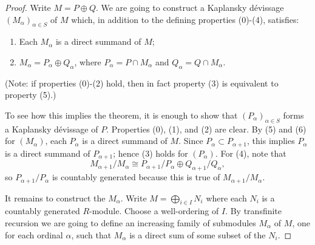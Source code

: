 \documentclass{amsart}
\theoremstyle{plain}
\theoremstyle{definition}
\theoremstyle{remark}
\numberwithin{equation}{subsection}
\begin{document}
\begin{proof}
Write $M = P \oplus Q$.  We are going to construct a Kaplansky d\'evissage
$(M_{\alpha})_{\alpha \in S}$ of $M$ which, in addition to the defining
properties (0)-(4), satisfies:
\begin{enumerate}
\item[(5)] Each $M_{\alpha}$ is a direct summand of $M$;
\item[(6)] $M_{\alpha} = P_{\alpha} \oplus Q_{\alpha}$, where $P_{\alpha} =P
\cap M_{\alpha}$ and $Q_\alpha = Q \cap M_{\alpha}$.
\end{enumerate}
(Note: if properties (0)-(2) hold, then in fact property (3) is equivalent to
property (5).)

\medskip\noindent
To see how this implies the theorem, it is enough to show that
$(P_{\alpha})_{\alpha \in S}$ forms a Kaplansky d\'evissage of $P$.  Properties
(0), (1), and (2) are clear.  By (5) and (6) for $(M_{\alpha})$, each
$P_{\alpha}$ is a direct summand of $M$.  Since $P_{\alpha} \subset P_{\alpha +
1}$, this implies $P_{\alpha}$ is a direct summand of $P_{\alpha + 1}$; hence
(3) holds for $(P_{\alpha})$.  For (4), note that
$$
M_{\alpha + 1}/M_{\alpha} \cong P_{\alpha + 1}/P_{\alpha} \oplus
Q_{\alpha + 1}/Q_{\alpha},
$$
so $P_{\alpha + 1}/P_{\alpha}$ is countably generated because this is true of
$M_{\alpha + 1}/M_{\alpha}$.

\medskip\noindent
It remains to construct the $M_{\alpha}$.  Write $M = \bigoplus_{i \in I} N_i$
where each $N_i$ is a countably generated $R$-module.  Choose a well-ordering
of $I$.  By transfinite recursion we are going to define an increasing family
of submodules $M_{\alpha}$ of $M$, one for each ordinal $\alpha$, such that
$M_{\alpha}$ is a direct sum of some subset of the $N_i$.


\end{proof}
\end{document}
